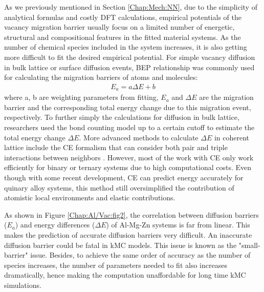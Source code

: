 As we previously mentioned in Section \ref{Chap:Mech:NN}, due to the simplicity of analytical formulas and costly \ac{DFT} calculations, empirical potentials of the vacancy migration barrier usually focus on a limited number of energetic, structural and compositional features in the fitted material systems. As the number of chemical species included in the system increases, it is also getting more difficult to fit the desired empirical potential. For simple vacancy diffusion in bulk lattice or surface diffusion events, \acf{BEP} relationship \cite{bronsted1924katalytische, evans1936further, bell1936theory} was commonly used for calculating the migration barriers of atoms and molecules:
\begin{subequations}
\begin{align}
E_a = a \Delta E + b
\label{Chap:Al/Vac:eq:BEP}
\end{align}
\end{subequations}
where a, b are weighting parameters from fitting, $E_a$ and $\Delta E$ are the migration barrier and the corresponding total energy change due to this migration event, respectively. To further simply the calculations for diffusion in bulk lattice, researchers used the bond counting model up to a certain cutoff to estimate the total energy change $\Delta E$\cite{soisson1996monte, soisson2010atomistic}. More advanced methods to calculate $\Delta E$ in coherent lattice include the \acf{CE} formalism that can consider both pair and triple interactions between neighbors \cite{sanchez1984generalized,zunger1994statics,van2001first,persson2010lj,natarajan2016early}. However, most of the work with \ac{CE} only work efficiently for binary or ternary systems due to high computational costs\cite{wu2016cluster}. Even though with some recent development\cite{nguyen2017cluster}, \ac{CE} can predict energy accurately for quinary alloy systems, this method still oversimplified the contribution of atomistic local environments and elastic contributions. 

As shown in Figure \ref{Chap:Al/Vac:fig2}, the correlation between diffusion barriers ($E_a$) and energy differences ($\Delta E$) of Al-Mg-Zn systems is far from linear. This makes the prediction of accurate diffusion barriers very difficult. An inaccurate diffusion barrier could be fatal in \ac{kMC} models. This issue is known as the "small-barrier" issue\cite{miron2004multiple}. Besides, to achieve the same order of accuracy as the number of species increases, the number of parameters needed to fit also increases dramatically\cite{castin2008use}, hence making the computation unaffordable for long time \ac{kMC} simulations.


